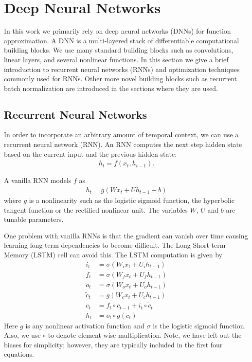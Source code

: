 \section{Deep Neural Networks}

In this work we primarily rely on deep neural networks (DNNs) for function
approximation. A DNN is a multi-layered stack of differentiable computational
building blocks. We use many standard building blocks such as convolutions,
linear layers, and several nonlinear functions. In this section we give a brief
introduction to recurrent neural networks (RNNs) and optimization techniques
commonly used for RNNs. Other more novel building blocks such as recurrent
batch normalization are introduced in the sections where they are used.

\subsection{Recurrent Neural Networks}

In order to incorporate an arbitrary amount of temporal context, we can use a
recurrent neural network (RNN). An RNN computes the next step hidden state
based on the current input and the previous hidden state:
\begin{align*}
h_t = f(x_t, h_{t-1}).
\end{align*}

A vanilla RNN models $f$ as
\begin{align*}
    h_t = g(W x_t + U h_{t-1} + b) 
\end{align*}
where $g$ is a nonlinearity such as the logistic sigmoid function, the
hyperbolic tangent function or the rectified nonlinear unit. The variables $W$,
$U$ and $b$ are tunable parameters.

One problem with vanilla RNNs is that the gradient can vanish over time causing
learning long-term dependencies to become difficult. The Long Short-term Memory
(LSTM) cell can avoid this. The LSTM computation is given by
\begin{align*}
    i_t &= \sigma(W_i x_t + U_i h_{t-1}) \\
    f_t &= \sigma(W_f x_t + U_f h_{t-1}) \\
    o_t &= \sigma(W_o x_t + U_o h_{t-1}) \\
    \tilde{c}_t &= g(W_c x_t + U_c h_{t-1}) \\
    c_t &= f_t \circ c_{t-1} + i_t \circ \tilde{c}_t \\
    h_t &= o_t \circ g(c_t)
\end{align*}
Here $g$ is any nonlinear activation function and $\sigma$ is the logistic
sigmoid function. Also, we use $\circ$ to denote element-wise multiplication.
Note, we have left out the biases for simplicity; however, they are typically
included in the first four equations.

